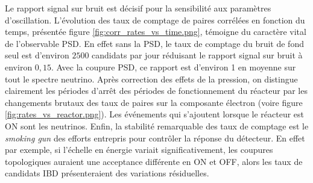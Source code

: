 Le rapport signal sur bruit est décisif pour la sensibilité aux paramètres d'oscillation. L'évolution des taux de comptage de paires corrélées en fonction du temps, présentée figure \ref{fig:corr_rates_vs_time.png}, témoigne du caractère vital de l'observable PSD. En effet sans la PSD, le taux de comptage du bruit de fond seul est d'environ $2500$ candidats par jour réduisant le rapport signal sur bruit à environ $0,15$. Avec la coupure PSD, ce rapport est d'environ 1 en moyenne sur tout le spectre neutrino. Après correction des effets de la pression, on distingue clairement les périodes d'arrêt des périodes de fonctionnement du réacteur par les changements brutaux des taux de paires sur la composante électron (voire figure \ref{fig:rates_vs_reactor.png}). Les événements qui s'ajoutent lorsque le réacteur est ON sont les neutrinos. Enfin, la stabilité remarquable des taux de comptage est le \textit{smoking gun} des efforts entrepris pour contrôler la réponse du détecteur. En effet par exemple, si l'échelle en énergie variait significativement, les coupures topologiques auraient une acceptance différente en ON et OFF, alors les taux de candidats IBD présenteraient des variations résiduelles.\\

